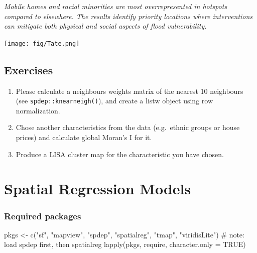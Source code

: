 \documentclass[
  letterpaper,
  DIV=11,
  numbers=noendperiod]{scrreprt}
\newenvironment{Shaded}{\begin{snugshade}}{\end{snugshade}}
\newcommand{\AttributeTok}[1]{\textcolor[rgb]{0.40,0.45,0.13}{#1}}
\newcommand{\CommentTok}[1]{\textcolor[rgb]{0.37,0.37,0.37}{#1}}
\newcommand{\ConstantTok}[1]{\textcolor[rgb]{0.56,0.35,0.01}{#1}}
\newcommand{\FunctionTok}[1]{\textcolor[rgb]{0.28,0.35,0.67}{#1}}
\newcommand{\NormalTok}[1]{\textcolor[rgb]{0.00,0.23,0.31}{#1}}
\newcommand{\OtherTok}[1]{\textcolor[rgb]{0.00,0.23,0.31}{#1}}
\newcommand{\StringTok}[1]{\textcolor[rgb]{0.13,0.47,0.30}{#1}}
\begin{document}
\emph{Mobile homes and racial minorities are most overrepresented in
hotspots compared to elsewhere. The results identify priority locations
where interventions can mitigate both physical and social aspects of
flood vulnerability.}

\texttt{[image: fig/Tate.png]}

\hypertarget{exercises-1}{%
\section{Exercises}\label{exercises-1}}

\begin{enumerate}
\def\labelenumi{\arabic{enumi}.}
\item
  Please calculate a neighbours weights matrix of the nearest 10
  neighbours (see \texttt{spdep::knearneigh()}), and create a listw
  object using row normalization.
\item
  Chose another characteristics from the data (e.g.~ethnic groups or
  house prices) and calculate global Moran's I for it.
\item
  Produce a LISA cluster map for the characteristic you have chosen.
\end{enumerate}


\hypertarget{spatial-regression-models}{%
\chapter{Spatial Regression Models}\label{spatial-regression-models}}

\newcommand{\Exp}{\mathrm{E}}
\newcommand\given[1][]{\:#1\vert\:}
\newcommand{\Cov}{\mathrm{Cov}}
\newcommand{\Var}{\mathrm{Var}}
\newcommand{\rank}{\mathrm{rank}}
\newcommand{\bm}[1]{\boldsymbol{\mathbf{#1}}}
\newcommand{\tr}{\mathrm{tr}}
\newcommand{\plim}{\operatornamewithlimits{plim}}
\newcommand{\diag}{\mathrm{diag}}

\hypertarget{required-packages-5}{%
\subsection*{Required packages}\label{required-packages-5}}

\begin{Shaded}
\begin{Highlighting}[]
\NormalTok{pkgs }\OtherTok{\textless{}{-}} \FunctionTok{c}\NormalTok{(}\StringTok{"sf"}\NormalTok{, }\StringTok{"mapview"}\NormalTok{, }\StringTok{"spdep"}\NormalTok{, }\StringTok{"spatialreg"}\NormalTok{, }\StringTok{"tmap"}\NormalTok{, }\StringTok{"viridisLite"}\NormalTok{) }\CommentTok{\# note: load spdep first, then spatialreg}
\FunctionTok{lapply}\NormalTok{(pkgs, require, }\AttributeTok{character.only =} \ConstantTok{TRUE}\NormalTok{)}
\end{Highlighting}
\end{Shaded}
\end{document}
